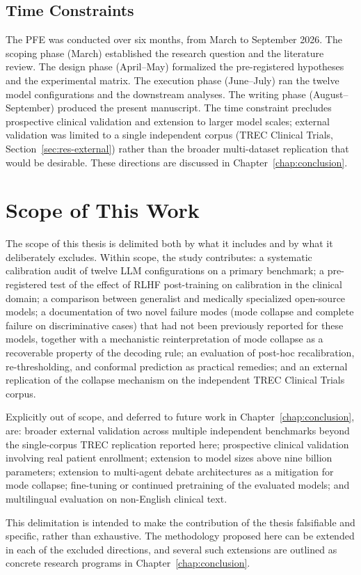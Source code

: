 \subsection{Time Constraints}
\label{subsec:ctx-time}

The PFE was conducted over six months, from March to September 2026. 
The scoping phase (March) established the research question and the 
literature review. The design phase (April--May) formalized the 
pre-registered hypotheses and the experimental matrix. The execution 
phase (June--July) ran the twelve model configurations and the 
downstream analyses. The writing phase (August--September) produced 
the present manuscript. The time constraint precludes prospective 
clinical validation and extension to larger model scales; external 
validation was limited to a single independent corpus (TREC Clinical 
Trials, Section~\ref{sec:res-external}) rather than the broader 
multi-dataset replication that would be desirable. These directions 
are discussed in Chapter~\ref{chap:conclusion}.

\section{Scope of This Work}
\label{sec:ctx-scope}

The scope of this thesis is delimited both by what it includes and by 
what it deliberately excludes. Within scope, the study contributes: a 
systematic calibration audit of twelve LLM configurations on a 
primary benchmark; a pre-registered test of the effect of RLHF 
post-training on calibration in the clinical domain; a comparison 
between generalist and medically specialized open-source models; a 
documentation of two novel failure modes (mode collapse and complete 
failure on discriminative cases) that had not been previously reported 
for these models, together with a mechanistic reinterpretation of mode 
collapse as a recoverable property of the decoding rule; an evaluation 
of post-hoc recalibration, re-thresholding, and conformal prediction 
as practical remedies; and an external replication of the collapse 
mechanism on the independent TREC Clinical Trials corpus.

Explicitly out of scope, and deferred to future work in 
Chapter~\ref{chap:conclusion}, are: broader external validation across 
multiple independent benchmarks beyond the single-corpus TREC 
replication reported here; prospective clinical validation involving 
real patient enrollment; extension to model sizes above nine billion 
parameters; extension to multi-agent debate architectures as a 
mitigation for mode collapse; fine-tuning or continued pretraining of 
the evaluated models; and multilingual evaluation on non-English 
clinical text.

This delimitation is intended to make the contribution of the thesis 
falsifiable and specific, rather than exhaustive. The methodology 
proposed here can be extended in each of the excluded directions, and 
several such extensions are outlined as concrete research programs in 
Chapter~\ref{chap:conclusion}.